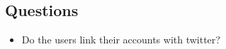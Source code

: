 \documentclass[11pt,english,numbers=endperiod,parskip=half]{scrartcl}
\begin{document}
  \subsection{Questions}
    \begin{itemize}
      \item{Do the users link their accounts with twitter?}
    \end{itemize}
\end{document}
